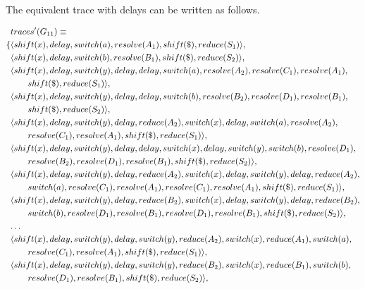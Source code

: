 \documentclass[a4paper,11pt]{article}
\begin{document}
The equivalent trace with delays can be written as follows.

{\small\parbox{\textwidth}{\begin{align*}
&traces^{\prime}(G_{11}) \equiv \\
\{ & \langle shift(x), delay, switch(a), resolve(A_1), shift(\$), reduce(S_1) \rangle,\\
   & \langle shift(x), delay, switch(b), resolve(B_1), shift(\$), reduce(S_2) \rangle,\\
   & \langle shift(x), delay, switch(y), delay, delay, switch(a), resolve(A_2), resolve(C_1), resolve(A_1), \\ & \qquad shift(\$), reduce(S_1) \rangle,\\
   & \langle shift(x), delay, switch(y), delay, delay, switch(b), resolve(B_2), resolve(D_1), resolve(B_1), \\ & \qquad shift(\$), reduce(S_2) \rangle,\\
   & \langle shift(x), delay, switch(y), delay, reduce(A_2), switch(x), delay, switch(a), resolve(A_2), \\ & \qquad resolve(C_1), resolve(A_1), shift(\$), reduce(S_1) \rangle,\\
   & \langle shift(x), delay, switch(y), delay, delay, switch(x), delay, switch(y), switch(b), resolve(D_1), \\ & \qquad resolve(B_2), resolve(D_1), resolve(B_1), shift(\$), reduce(S_2) \rangle,\\
   & \langle shift(x), delay, switch(y), delay, reduce(A_2), switch(x), delay, switch(y), delay, reduce(A_2), \\ & \qquad switch(a), resolve(C_1), resolve(A_1), resolve(C_1), resolve(A_1), shift(\$), reduce(S_1) \rangle,\\
   & \langle shift(x), delay, switch(y), delay, reduce(B_2), switch(x), delay, switch(y), delay, reduce(B_2), \\ & \qquad switch(b), resolve(D_1), resolve(B_1), resolve(D_1), resolve(B_1), shift(\$), reduce(S_2) \rangle,\\
   & \textellipsis \\
   & \langle shift(x), delay, switch(y), delay, switch(y), reduce(A_2), switch(x), reduce(A_1), switch(a), \\ & \qquad resolve(C_1), resolve(A_1), shift(\$), reduce(S_1) \rangle,\\
   & \langle shift(x), delay, switch(y), delay, switch(y), reduce(B_2), switch(x), reduce(B_1), switch(b), \\ & \qquad resolve(D_1), resolve(B_1), shift(\$), reduce(S_2) \rangle,\\

\end{align*}}}
\end{document}
